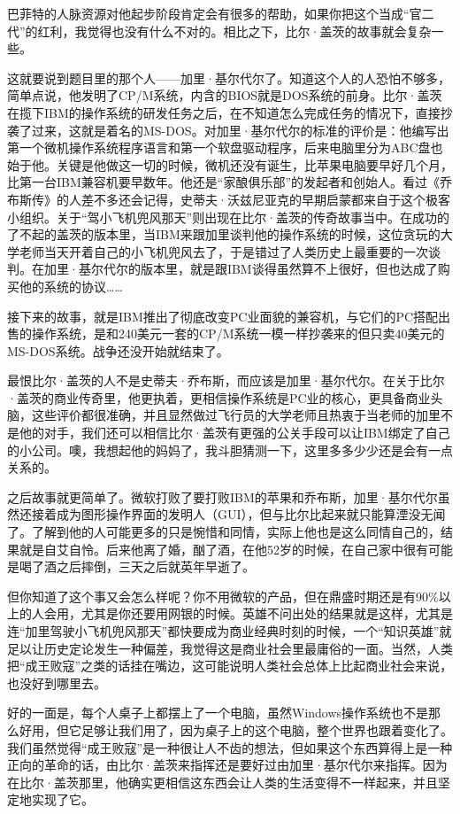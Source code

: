 巴菲特的人脉资源对他起步阶段肯定会有很多的帮助，如果你把这个当成``官二代''的红利，我觉得也没有什么不对的。相比之下，比尔·盖茨的故事就会复杂一些。

这就要说到题目里的那个人------加里·基尔代尔了。知道这个人的人恐怕不够多，简单点说，他发明了CP/M系统，内含的BIOS就是DOS系统的前身。比尔·盖茨在揽下IBM的操作系统的研发任务之后，在不知道怎么完成任务的情况下，直接抄袭了过来，这就是着名的MS-DOS。对加里·基尔代尔的标准的评价是：他编写出第一个微机操作系统程序语言和第一个软盘驱动程序，后来电脑里分为ABC盘也始于他。关键是他做这一切的时候，微机还没有诞生，比苹果电脑要早好几个月，比第一台IBM兼容机要早数年。他还是``家酿俱乐部''的发起者和创始人。看过《乔布斯传》的人差不多还会记得，史蒂夫·沃兹尼亚克的早期启蒙都来自于这个极客小组织。关于``驾小飞机兜风那天''则出现在比尔·盖茨的传奇故事当中。在成功的了不起的盖茨的版本里，当IBM来跟加里谈判他的操作系统的时候，这位贪玩的大学老师当天开着自己的小飞机兜风去了，于是错过了人类历史上最重要的一次谈判。在加里·基尔代尔的版本里，就是跟IBM谈得虽然算不上很好，但也达成了购买他的系统的协议\ldots\ldots{}

接下来的故事，就是IBM推出了彻底改变PC业面貌的兼容机，与它们的PC搭配出售的操作系统，是和240美元一套的CP/M系统一模一样抄袭来的但只卖40美元的MS-DOS系统。战争还没开始就结束了。

最恨比尔·盖茨的人不是史蒂夫·乔布斯，而应该是加里·基尔代尔。在关于比尔·盖茨的商业传奇里，他更执着，更相信操作系统是PC业的核心，更具备商业头脑，这些评价都很准确，并且显然做过飞行员的大学老师且热衷于当老师的加里不是他的对手，我们还可以相信比尔·盖茨有更强的公关手段可以让IBM绑定了自己的小公司。噢，我想起他的妈妈了，我斗胆猜测一下，这里多多少少还是会有一点关系的。

之后故事就更简单了。微软打败了要打败IBM的苹果和乔布斯，加里·基尔代尔虽然还接着成为图形操作界面的发明人（GUI），但与比尔比起来就只能算湮没无闻了。了解到他的人可能更多的只是惋惜和同情，实际上他也是这么同情自己的，结果就是自艾自怜。后来他离了婚，酗了酒，在他52岁的时候，在自己家中很有可能是喝了酒之后摔倒，三天之后就英年早逝了。

但你知道了这个事又会怎么样呢？你不用微软的产品，但在鼎盛时期还是有90\%以上的人会用，尤其是你还要用网银的时候。英雄不问出处的结果就是这样，尤其是连``加里驾驶小飞机兜风那天''都快要成为商业经典时刻的时候，一个``知识英雄''就足以让历史定论发生一种偏差，我觉得这是商业社会里最庸俗的一面。当然，人类把``成王败寇''之类的话挂在嘴边，这可能说明人类社会总体上比起商业社会来说，也没好到哪里去。

好的一面是，每个人桌子上都摆上了一个电脑，虽然Windows操作系统也不是那么好用，但它足够让我们用了，因为桌子上的这个电脑，整个世界也跟着变化了。我们虽然觉得``成王败寇''是一种很让人不齿的想法，但如果这个东西算得上是一种正向的革命的话，由比尔·盖茨来指挥还是要好过由加里·基尔代尔来指挥。因为在比尔·盖茨那里，他确实更相信这东西会让人类的生活变得不一样起来，并且坚定地实现了它。

